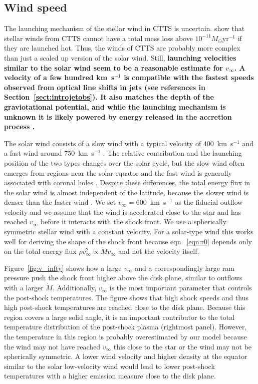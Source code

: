 \subsection{Wind speed}
The launching mechanism of the stellar wind in CTTS is uncertain. \citet{2007IAUS..243..299M} show that stellar winds from CTTS cannot have a total mass loss above $10^{-11}M_\odot\mathrm{ yr}^{-1}$ if they are launched hot. 
Thus, the winds of CTTS are probably more complex than just a scaled up version of the solar wind.
Still, \textbf{launching velocities similar to the solar wind seem to be a reasonable estimate for $v_\infty$. A velocity of a few hundred km~s$^{-1}$ is compatible with the fastest speeds observed from optical line shifts in jets (see references in Section~\ref{sect:introjetobs}). It also matches the depth of the graviotational potential, and while the launching mechanism is unknown it is likely powered by energy released in the accretion process \citep{1988ApJ...332L..41K,2005ApJ...632L.135M}.}

The solar wind consists of a slow wind with a typical velocity of 400~km~s$^{-1}$ and a fast wind around 750~km~s$^{-1}$ \citep{2005JGRA..110.7109F}. The relative contribution and the launching position of the two types changes over the solar cycle, but the slow wind often emerges from regions near the solar equator and the fast wind is generally associated with coronal holes \citep{1999GeoRL..26.2901G,2003A&A...408.1165B,2009LRSP....6....3C}. Despite these differences, the total energy flux in the solar wind is almost independent of the latitude, because the slower wind is denser than the faster wind \citep{2012SoPh..279..197L}. We set $v_\infty=600$~km~s$^{-1}$ as the fiducial outflow velocity and we assume that the wind is accelerated close to the star and has reached $v_\infty$ before it interacts with the shock front. We use a spherically symmetric stellar wind with a constant velocity. For a solar-type wind this works well for deriving the shape of the shock front because eqn.~\ref{eqn:r0} depends only on the total energy flux $\rho v^2_\infty \propto \dot M v_\infty$ and not the velocity itself. 

Figure~\ref{fig:v_infty} shows how a large $v_\infty$ and a correspondingly large ram pressure push the shock front higher above the disk plane, similar to outflows with a larger $\dot M$. Additionally, $v_\infty$ is the most important parameter that controls the post-shock temperatures.
The figure shows that high shock speeds and thus high post-shock temperatures are reached close to the disk plane. Because this region covers a large solid angle, it is an important contributor to the total temperature distribution of the post-shock plasma (rightmost panel). However, the temperature in this region is probably overestimated by our model because the wind may not have reached $v_\infty$ this close to the star or the wind may not be spherically symmetric. A lower wind velocity and higher density at the equator similar to the solar low-velocity wind would lead to lower post-shock temperatures with a higher emission measure close to the disk plane.
